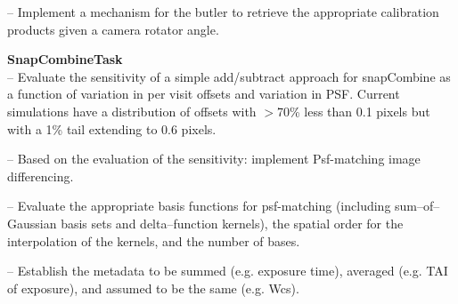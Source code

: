 \documentclass[prd, nofootinbib, floatfix, 11pt,tightenlines,times]{article}
\def\arcsec{^{\prime\prime}}
\begin{document}
-- Implement a mechanism for the butler to retrieve the appropriate calibration products given a camera rotator angle.

{\bf SnapCombineTask}\\
-- Evaluate the sensitivity of a simple add/subtract approach for
snapCombine as a function of variation in per visit offsets and
variation in PSF. Current simulations have a distribution of offsets
with $>$70\% less than 0.1 pixels but with a 1\% tail extending to 0.6
pixels.

-- Based on the evaluation of the sensitivity: implement Psf-matching
image differencing.

-- Evaluate the appropriate basis functions for psf-matching
(including sum--of--Gaussian basis sets and  delta--function kernels),
the spatial order for the interpolation of the kernels,  and the
number of bases.

-- Establish the metadata to be summed (e.g. exposure time), averaged
(e.g. TAI of exposure), and assumed to be the same (e.g. Wcs).




%



\end{document}

